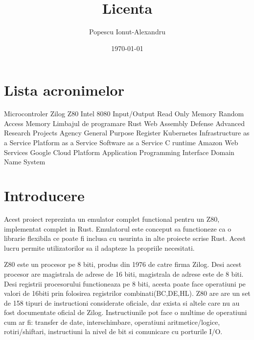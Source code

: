 \documentclass[titlepage,12pt]{article}
\begin{document}
\title{Licenta}
\author{Popescu Ionut-Alexandru}
\date{\today}

\maketitle
\renewcommand{\contentsname}{Cuprins}
\renewcommand{\listfigurename}{Lista figurilor}
\renewcommand{\listtablename}{Lista tabelelor}
\renewcommand{\figurename}{Figura}
\renewcommand{\tablename}{Tabela}
\renewcommand{\lstlistingname}{Cod}
\tableofcontents
\clearpage
\listoffigures
\clearpage
\listoftables
\clearpage
\section*{Lista acronimelor} %
\begin{acronym}
           {Microcontroler Zilog Z80}
         {Intel 8080}
            {Input/Output}
           {Read Only Memory}
           {Random Access Memory}
          {Limbajul de programare Rust}
          {Web Assembly}
         {Defense Advanced Research Projects Agency}
           {General Purpose Register}
           {Kubernetes}
          {Infrastructure as a Service}
          {Platform as a Service}
          {Software as a Service}
           {C runtime}
           {Amazon Web Services}
           {Google Cloud Platform}
           {Application Programming Interface}
           {Domain Name System}
\end{acronym}
\clearpage

\section{Introducere}
Acest proiect reprezinta un emulator complet functional pentru un \ac {Z80}, implementat complet in \ac {Rust}.
Emulatorul este conceput sa functioneze ca o librarie flexibila ce poate fi inclusa cu usurinta in alte proiecte scrise Rust. Acest lucru permite utilizatorilor sa il adapteze la propriile necesitati.

\ac {Z80} este un procesor pe 8 biti, produs din 1976 de catre firma Zilog. Desi acest procesor are magistrala de adrese de 16 biti, magistrala de adrese este de 8 biti.
Desi registrii procesorului functioneaza pe 8 biti, acesta poate face operatiuni pe valori de 16biti prin folosirea registrilor combinati(BC,DE,HL).
Z80 are are un set de 158 tipuri de instructioni considerate oficiale, dar exista si altele care nu au fost documentate oficial de Zilog. Instructiunile pot face o multime de operatiuni cum ar fi: transfer de date, interschimbare, operatiuni aritmetice/logice, rotiri/shiftari, instructiuni la nivel de bit si comunicare cu porturile I/O.
\end{document}
